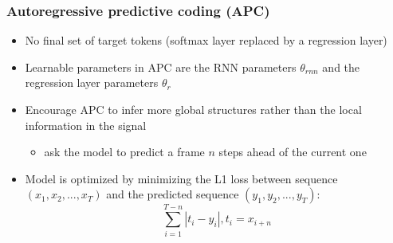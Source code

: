 \documentclass[table]{beamer}
\begin{document}
\begin{frame}
\frametitle{Autoregressive predictive coding (APC)}
		\begin{itemize}
			\item No final set of target tokens (softmax layer replaced by a regression layer)
			\item Learnable parameters in APC are the RNN parameters $\theta_{rnn}$ and the regression layer parameters $\theta_r$
			\item Encourage APC to infer more global structures rather than the local information in the signal
				\begin{itemize}
				\item ask the model to predict a frame $n$ steps ahead of the current one
				\end{itemize}
			\item Model is optimized by minimizing the L1 loss between sequence $(x_1,x_2,...,x_T )$ and the predicted sequence $(y_1,y_2,...,y_T )$:
				\begin{equation}
				\sum_{i=1}^{T-n} | t_i-y_i |,t_i=x_{i+n}
				\end{equation}			
		\end{itemize} 
\end{frame}

%
%
%
\end{document}

